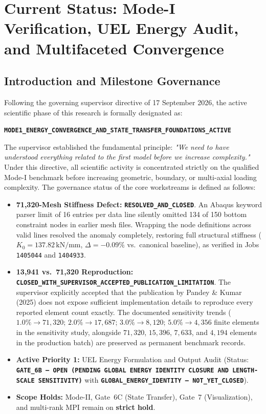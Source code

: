 \chapter{Current Status: Mode-I Verification, UEL Energy Audit, and Multifaceted Convergence}
\label{cha:current_status}
\label{ch:current_status}

\section{Introduction and Milestone Governance}
\label{sec:gate6b_governance}

Following the governing supervisor directive of 17 September 2026, the active scientific phase of this research is formally designated as:
\begin{center}
  \textbf{\texttt{MODE1\_ENERGY\_CONVERGENCE\_AND\_STATE\_TRANSFER\_FOUNDATIONS\_ACTIVE}}
\end{center}
The supervisor established the fundamental principle: \textit{"We need to have understood everything related to the first model before we increase complexity."} Under this directive, all scientific activity is concentrated strictly on the qualified Mode-I benchmark before increasing geometric, boundary, or multi-axial loading complexity. The governance status of the core workstreams is defined as follows:
\begin{itemize}
  \item \textbf{71,320-Mesh Stiffness Defect:} \textbf{\texttt{RESOLVED\_AND\_CLOSED}}. An Abaqus keyword parser limit of 16 entries per data line silently omitted 134 of 150 bottom constraint nodes in earlier mesh files. Wrapping the node definitions across valid lines resolved the anomaly completely, restoring full structural stiffness ($K_0 = 137.82\,\mathrm{kN/mm}$, $\Delta = -0.09\%$ vs.\ canonical baseline), as verified in Jobs \texttt{1405044} and \texttt{1404933}.
  \item \textbf{13,941 vs.\ 71,320 Reproduction:} \textbf{\texttt{CLOSED\_WITH\_SUPERVISOR\_ACCEPTED\_PUBLICATION\_LIMITATION}}. The supervisor explicitly accepted that the publication by Pandey \& Kumar (2025) does not expose sufficient implementation details to reproduce every reported element count exactly. The documented sensitivity trends ($1.0\% \to 71{,}320$; $2.0\% \to 17{,}687$; $3.0\% \to 8{,}120$; $5.0\% \to 4{,}356$ finite elements in the sensitivity study, alongside $71{,}320$, $15{,}396$, $7{,}633$, and $4{,}194$ elements in the production batch) are preserved as permanent benchmark records.
  \item \textbf{Active Priority 1:} UEL Energy Formulation and Output Audit (Status: \textbf{\texttt{GATE\_6B --- OPEN (PENDING GLOBAL ENERGY IDENTITY CLOSURE AND LENGTH-SCALE SENSITIVITY)}} with \textbf{\texttt{GLOBAL\_ENERGY\_IDENTITY --- NOT\_YET\_CLOSED}}).
  \item \textbf{Scope Holds:} Mode-II, Gate~6C (State Transfer), Gate~7 (Visualization), and multi-rank MPI remain on \textbf{strict hold}.
\end{itemize}

